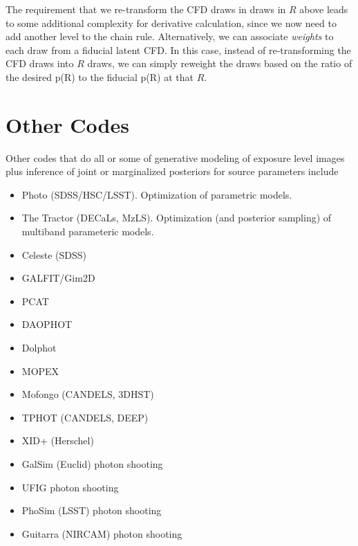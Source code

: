 \documentclass[modern]{aastex6}
\begin{document}
The requirement that we re-transform the CFD draws in draws in $R$ above leads to some additional complexity for derivative calculation, 
since we now need to add another level to the chain rule.
Alternatively, we can associate \emph{weights} to each draw from a fiducial latent CFD.
In this case, instead of re-transforming the CFD draws into $R$ draws, 
we can simply reweight the draws based on the ratio of the desired p(R) to the fiducial p(R) at that $R$.


\section{Other Codes}
Other codes that do all or some of generative modeling of exposure level images plus inference of joint or marginalized posteriors for source parameters include
\begin{itemize}
\item Photo (SDSS/HSC/LSST).  Optimization of parametric models.
\item The Tractor (DECaLs, MzLS).  Optimization (and posterior sampling) of multiband parameteric models.
\item Celeste (SDSS)
\item GALFIT/Gim2D

\item PCAT
\item DAOPHOT
\item Dolphot
\item MOPEX

\item Mofongo (CANDELS, 3DHST)
\item TPHOT (CANDELS, DEEP) 
\item XID+ (Herschel)

\item GalSim (Euclid) photon shooting
\item UFIG photon shooting
\item PhoSim (LSST) photon shooting
\item Guitarra (NIRCAM) photon shooting

\end{itemize}
\end{document}
